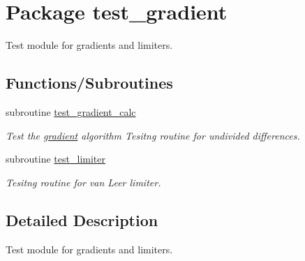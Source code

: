 \hypertarget{a00086}{
\section{Package test\_\-gradient}
\label{a00086}
}
Test module for gradients and limiters.  


\subsection*{Functions/Subroutines}
\begin{CompactItemize}
\item 
\hypertarget{a00086_ee6780a9a7e035894ddab56a1196cf0f}{
subroutine \hyperlink{a00086_ee6780a9a7e035894ddab56a1196cf0f}{test\_\-gradient\_\-calc}}
\label{a00086_ee6780a9a7e035894ddab56a1196cf0f}

\begin{CompactList}\small\item\em Test the \hyperlink{a00061}{gradient} algorithm Tesitng routine for undivided differences. \item\end{CompactList}\item 
\hypertarget{a00086_ca178bd5a6926ed9fbd384a94e581cd5}{
subroutine \hyperlink{a00086_ca178bd5a6926ed9fbd384a94e581cd5}{test\_\-limiter}}
\label{a00086_ca178bd5a6926ed9fbd384a94e581cd5}

\begin{CompactList}\small\item\em Tesitng routine for van Leer limiter. \item\end{CompactList}\end{CompactItemize}


\subsection{Detailed Description}
Test module for gradients and limiters. 

